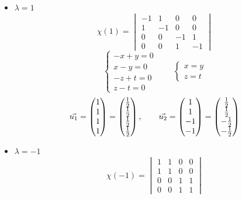 \begin{itemize}
	\item $ \lambda = 1 $
    $$ \chi(1) =
    \begin{vmatrix}
    	-1 & 1 & 0 & 0 \\
        1 & -1 & 0 & 0 \\
        0 & 0 & -1 & 1 \\
        0 & 0 & 1 & -1
    \end{vmatrix} $$
    $$
    \begin{cases}
    	-x + y = 0 \\
        x - y = 0 \\
        -z + t = 0 \\
        z - t = 0
    \end{cases} \qquad
    \begin{cases}
    	x = y \\
        z = t
    \end{cases} $$
    $$ \vec{u_1} =
    \begin{pmatrix}
    	1 \\
        1 \\
        1 \\
        1
    \end{pmatrix} =
    \begin{pmatrix}
    	\frac{1}2 \\
        \frac{1}2 \\
        \frac{1}2 \\
        \frac{1}2
    \end{pmatrix}, \qquad \vec{u_2} =
    \begin{pmatrix}
    	1 \\
        1 \\
        -1 \\
        -1
    \end{pmatrix} =
    \begin{pmatrix}
    	\frac{1}2 \\
        \frac{1}2 \\
        -\frac{1}2 \\
        -\frac{1}2
    \end{pmatrix} $$
    \item $ \lambda = - 1 $
    $$ \chi(-1) =
    \begin{vmatrix}
    	1 & 1 & 0 & 0 \\
        1 & 1 & 0 & 0 \\
        0 & 0 & 1 & 1 \\
        0 & 0 & 1 & 1
    \end{vmatrix} $$

\end{itemize}

